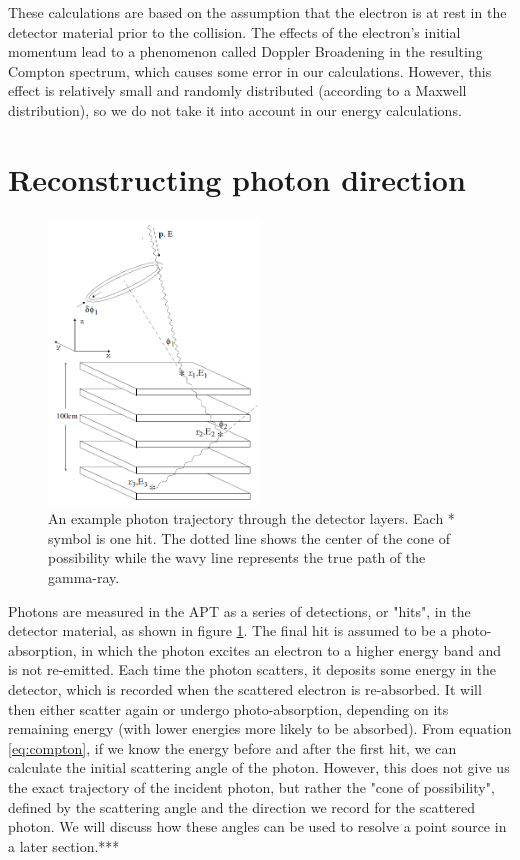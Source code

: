 These calculations are based on the assumption that the electron is at rest in the detector material prior to the collision. The effects of the electron's initial momentum lead to a phenomenon called Doppler Broadening in the resulting Compton spectrum, which causes some error in our calculations. However, this effect is relatively small and randomly distributed (according to a Maxwell distribution), so we do not take it into account in our energy calculations.


\section{Reconstructing photon direction}

\begin{figure}
    \centering
    \includegraphics[width=0.5\textwidth]{detector_scattering.PNG}
    \caption{An example photon trajectory through the detector layers. Each * symbol is one hit. The dotted line shows the center of the cone of possibility while the wavy line represents the true path of the gamma-ray. \cite{comptonThesis}}
    \label{fig:scatters}
\end{figure}

Photons are measured in the APT as a series of detections, or "hits", in the detector material, as shown in figure \ref{fig:scatters}. The final hit is assumed to be a photo-absorption, in which the photon excites an electron to a higher energy band and is not re-emitted. Each time the photon scatters, it deposits some energy in the detector, which is recorded when the scattered electron is re-absorbed. It will then either scatter again or undergo photo-absorption, depending on its remaining energy (with lower energies more likely to be absorbed). From equation \ref{eq:compton}, if we know the energy before and after the first hit, we can calculate the initial scattering angle of the photon. However, this does not give us the exact trajectory of the incident photon, but rather the "cone of possibility", defined by the scattering angle and the direction we record for the scattered photon. We will discuss how these angles can be used to resolve a point source in a later section.***

